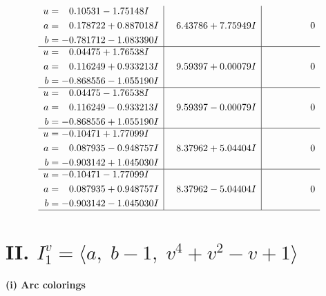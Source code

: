 \documentclass[1p]{elsarticle_modified}
\theoremstyle{definition}
\begin{document}
$$\begin{array}{c|c|c}
\begin{aligned}
u &= \phantom{-}0.10531 - 1.75148 I \\
a &= \phantom{-}0.178722 + 0.887018 I \\
b &= -0.781712 - 1.083390 I\end{aligned}
 & \phantom{-}6.43786 + 7.75949 I & \phantom{-0.000000 } 0 \\ \hline\begin{aligned}
u &= \phantom{-}0.04475 + 1.76538 I \\
a &= \phantom{-}0.116249 + 0.933213 I \\
b &= -0.868556 - 1.055190 I\end{aligned}
 & \phantom{-}9.59397 + 0.00079 I & \phantom{-0.000000 } 0 \\ \hline\begin{aligned}
u &= \phantom{-}0.04475 - 1.76538 I \\
a &= \phantom{-}0.116249 - 0.933213 I \\
b &= -0.868556 + 1.055190 I\end{aligned}
 & \phantom{-}9.59397 - 0.00079 I & \phantom{-0.000000 } 0 \\ \hline\begin{aligned}
u &= -0.10471 + 1.77099 I \\
a &= \phantom{-}0.087935 - 0.948757 I \\
b &= -0.903142 + 1.045030 I\end{aligned}
 & \phantom{-}8.37962 + 5.04404 I & \phantom{-0.000000 } 0 \\ \hline\begin{aligned}
u &= -0.10471 - 1.77099 I \\
a &= \phantom{-}0.087935 + 0.948757 I \\
b &= -0.903142 - 1.045030 I\end{aligned}
 & \phantom{-}8.37962 - 5.04404 I & \phantom{-0.000000 } 0\\
 \hline 
 \end{array}$$\newpage\newpage\renewcommand{\arraystretch}{1}
\centering \section*{II. $I^v_{1}= \langle a,\;b-1,\;v^4+v^2- v+1 \rangle$}
\flushleft \textbf{(i) Arc colorings}\\
\end{document}
